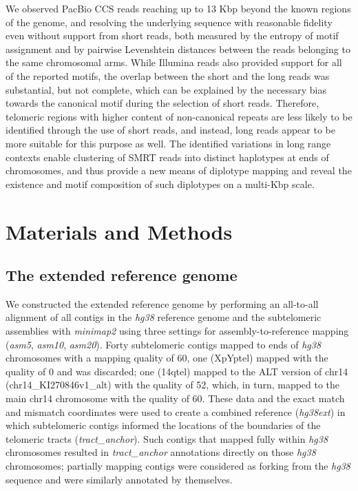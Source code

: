 \documentclass{article}
\begin{document}
We observed PacBio CCS reads reaching up to 13 Kbp beyond the known regions of the genome, and resolving the underlying sequence with reasonable fidelity \textendash{} even without support from short reads, \textendash{} both measured by the entropy of motif assignment and by pairwise Levenshtein distances between the reads belonging to the same chromosomal arms.
While Illumina reads also provided support for all of the reported motifs, the overlap between the short and the long reads was substantial, but not complete, which can be explained by the necessary bias towards the canonical motif during the selection of short reads.
Therefore, telomeric regions with higher content of non-canonical repeats are less likely to be identified through the use of short reads, and instead, long reads appear to be more suitable for this purpose as well.
The identified variations in long range contexts enable clustering of SMRT reads into distinct haplotypes at ends of chromosomes, and thus provide a new means of diplotype mapping and reveal the existence and motif composition of such diplotypes on a multi-Kbp scale.

\section*{Materials and Methods}  \label{sec:methods}

\subsection*{The extended reference genome}
We constructed the extended reference genome by performing an all-to-all alignment of all contigs in the \textit{hg38} reference genome \cite{grch38,hg38} and the subtelomeric assemblies \cite{riethman2014} with \textit{minimap2} \cite{minimap} using three settings for assembly-to-reference mapping (\textit{asm5}, \textit{asm10}, \textit{asm20}).
Forty subtelomeric contigs mapped to ends of \textit{hg38} chromosomes with a mapping quality of 60, one (XpYptel) mapped with the quality of 0 and was discarded; one (14qtel) mapped to the ALT version of chr14 (chr14\_KI270846v1\_alt) with the quality of 52, which, in turn, mapped to the main chr14 chromosome with the quality of 60.
These data and the exact match and mismatch coordinates were used to create a combined reference (\textit{hg38ext}) in which subtelomeric contigs informed the locations of the boundaries of the telomeric tracts (\textit{tract\_anchor}).
Such contigs that mapped fully within \textit{hg38} chromosomes resulted in \textit{tract\_anchor} annotations directly on those \textit{hg38} chromosomes; partially mapping contigs were considered as forking from the \textit{hg38} sequence and were similarly annotated by themselves.
\end{document}
